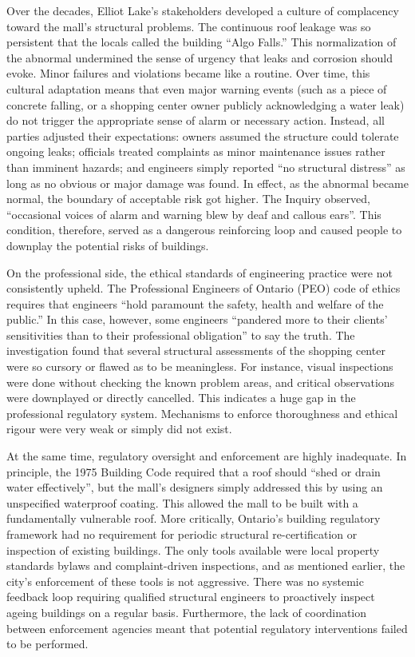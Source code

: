 \documentclass[12pt]{article}
\begin{document}
Over the decades, Elliot Lake’s stakeholders developed a culture of complacency toward the mall’s structural problems. The continuous roof leakage was so persistent that the locals called the building “Algo Falls.” This normalization of the abnormal undermined the sense of urgency that leaks and corrosion should evoke. Minor failures and violations became like a routine. Over time, this cultural adaptation means that even major warning events (such as a piece of concrete falling, or a shopping center owner publicly acknowledging a water leak) do not trigger the appropriate sense of alarm or necessary action. Instead, all parties adjusted their expectations: owners assumed the structure could tolerate ongoing leaks; officials treated complaints as minor maintenance issues rather than imminent hazards; and engineers simply reported “no structural distress” as long as no obvious or major damage was found. In effect, as the abnormal became normal, the boundary of acceptable risk got higher. The Inquiry observed, “occasional voices of alarm and warning blew by deaf and callous ears”. This condition, therefore, served as a dangerous reinforcing loop and caused people to downplay the potential risks of buildings.

On the professional side, the ethical standards of engineering practice were not consistently upheld. The Professional Engineers of Ontario (PEO) code of ethics requires that engineers “hold paramount the safety, health and welfare of the public.” In this case, however, some engineers “pandered more to their clients’ sensitivities than to their professional obligation” to say the truth. The investigation found that several structural assessments of the shopping center were so cursory or flawed as to be meaningless. For instance, visual inspections were done without checking the known problem areas, and critical observations were downplayed or directly cancelled. This indicates a huge gap in the professional regulatory system. Mechanisms to enforce thoroughness and ethical rigour were very weak or simply did not exist.

At the same time, regulatory oversight and enforcement are highly inadequate. In principle, the 1975 Building Code required that a roof should “shed or drain water effectively”, but the mall’s designers simply addressed this by using an unspecified waterproof coating. This allowed the mall to be built with a fundamentally vulnerable roof. More critically, Ontario’s building regulatory framework had no requirement for periodic structural re-certification or inspection of existing buildings. The only tools available were local property standards bylaws and complaint-driven inspections, and as mentioned earlier, the city’s enforcement of these tools is not aggressive. There was no systemic feedback loop requiring qualified structural engineers to proactively inspect ageing buildings on a regular basis. Furthermore, the lack of coordination between enforcement agencies meant that potential regulatory interventions failed to be performed. 
\end{document}
